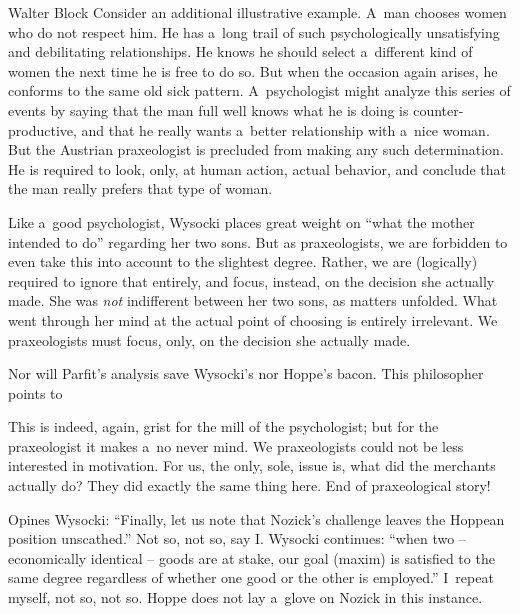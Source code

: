 \begin{artengenv}{Walter Block}
Consider an additional illustrative example. A~man chooses women who do not respect him. He has a~long trail of such psychologically unsatisfying and debilitating relationships. He knows he should select a~different kind of women the next time he is free to do so. But when the occasion again arises, he conforms to the same old sick pattern. A~psychologist might analyze this series of events by saying that the man full well knows what he is doing is counter-productive, and that he really wants a~better relationship with a~nice woman. But the Austrian praxeologist is precluded from making any such determination. He is required to look, only, at human action, actual behavior, and conclude that the man really prefers that type of woman.

Like a~good psychologist, Wysocki places great weight on ``what the mother intended to do'' regarding her two sons. But as praxeologists, we are forbidden to even take this into account to the slightest degree. Rather, we are (logically) required to ignore that entirely, and focus, instead, on the decision she actually made. She was \textit{not} indifferent between her two sons, as matters unfolded. What went through her mind at the actual point of choosing is entirely irrelevant. We praxeologists must focus, only, on the decision she actually made.

Nor will Parfit's
\parencite*[][p.289]{parfit_what_2011} %
 analysis save Wysocki's nor Hoppe's bacon. This philosopher points to

This 
is indeed, again, grist for the mill of the psychologist; but for the praxeologist it makes a~no never mind. We praxeologists could not be less interested in motivation. For us, the only, sole, issue is, what did the merchants actually do? They did exactly the same thing here. End of praxeological story!

Opines Wysocki: ``Finally, let us note that Nozick's challenge leaves the Hoppean position unscathed.'' Not so, not so, say I. Wysocki continues: ``when two -- economically identical -- goods are at stake, our goal (maxim) is satisfied to the same degree regardless of whether one good or the other is employed.'' I~repeat myself, not so, not so. Hoppe does not lay a~glove on Nozick in this instance.


\end{artengenv}
